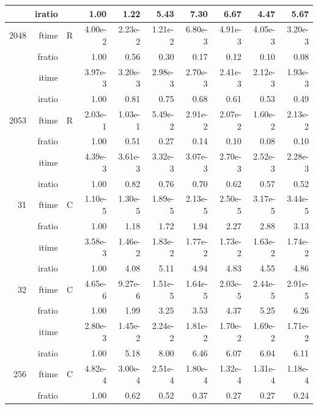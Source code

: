 \documentclass[a4paper]{article}
\begin{document}
\begin{table}[htbp]
\begin{center}
\begin{small}
\begin{tabular}{|r|r|r|r|r|r|r|r|r|r|}
     & iratio & &       1.00 &   1.22 &   5.43 &   7.30 &   6.67 &   4.47 &   5.67      \\ \hline 
  2048  & ftime & R  &  4.00e-2 &   2.23e-2 &   1.21e-2 &   6.80e-3 &   4.91e-3 &   4.05e-3 &   3.20e-3   \\ 
      & fratio & &      1.00 &   0.56 &   0.30 &   0.17 &   0.12 &   0.10 &   0.08      \\ 
     & itime & &        3.97e-3 &   3.20e-3 &   2.98e-3 &   2.70e-3 &   2.41e-3 &   2.12e-3 &   1.93e-3     \\ 
     & iratio & &       1.00 &   0.81 &   0.75 &   0.68 &   0.61 &   0.53 &   0.49       \\ \hline 
  2053  & ftime & R  &  2.03e-1 &   1.03e-1 &   5.49e-2 &   2.91e-2 &   2.07e-2 &   1.60e-2 &   2.13e-2    \\ 
      & fratio & &      1.00 &   0.51 &   0.27 &   0.14 &   0.10 &   0.08 &   0.10    \\ 
     & itime & &        4.39e-3 &   3.61e-3 &   3.32e-3 &   3.07e-3 &   2.70e-3 &   2.52e-3 &   2.28e-3      \\ 
     & iratio & &       1.00 &   0.82 &   0.76 &   0.70 &   0.62 &   0.57 &   0.52      \\ \hline \hline
    31  & ftime & C  &  1.10e-5 &   1.30e-5 &   1.89e-5 &   2.13e-5 &   2.50e-5 &   3.17e-5 &   3.44e-5    \\ 
      & fratio & &      1.00 &   1.18 &   1.72 &   1.94 &   2.27 &   2.88 &   3.13      \\ 
     & itime & &        3.58e-3 &   1.46e-2 &   1.83e-2 &   1.77e-2 &   1.73e-2 &   1.63e-2 &   1.74e-2      \\ 
     & iratio & &       1.00 &   4.08 &   5.11 &   4.94 &   4.83 &   4.55 &   4.86       \\ \hline 
    32  & ftime & C  &  4.65e-6 &   9.27e-6 &   1.51e-5 &   1.64e-5 &   2.03e-5 &   2.44e-5 &   2.91e-5    \\ 
      & fratio & &      1.00 &   1.99 &   3.25 &   3.53 &   4.37 &   5.25 &   6.26      \\ 
     & itime & &        2.80e-3 &   1.45e-2 &   2.24e-2 &   1.81e-2 &   1.70e-2 &   1.69e-2 &   1.71e-2      \\ 
     & iratio & &       1.00 &   5.18 &   8.00 &   6.46 &   6.07 &   6.04 &   6.11       \\ \hline 
   256  & ftime & C  &  4.82e-4 &   3.00e-4 &   2.51e-4 &   1.80e-4 &   1.32e-4 &   1.31e-4 &   1.18e-4    \\ 
      & fratio & &      1.00 &   0.62 &   0.52 &   0.37 &   0.27 &   0.27 &   0.24      \\ 

\end{tabular}
\end{small}
\end{center}
\end{table}
\end{document}
